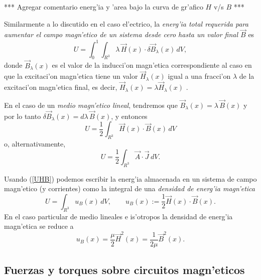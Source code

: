 *** Agregar comentario energ'ia y 'area bajo la curva de gr'afico $H$ v/s $B$ ***

Similarmente a lo discutido en el caso el'ectrico, la \textit{energ'ia total requerida para aumentar el campo magn'etico de un sistema desde cero hasta un valor final $\vec{B}$} es 
\begin{equation}
 U=\int_0^1\int_{R^3} \lambda \, \vec{H}(x)\cdot \delta\vec{B}_\lambda(x)\,dV,
\end{equation}
donde $\vec{B}_\lambda(x)$ es el valor de la inducci'on magn'etica correspondiente al caso en que la excitaci'on magn'etica tiene un valor $\vec{H}_\lambda(x)$ igual a una fracci'on $\lambda$ de la excitaci'on magn'etica final, es decir, $\vec{H}_\lambda (x)=\lambda\vec{H}_\lambda (x)$ .

En el caso de un \textit{medio magn'etico lineal}, tendremos que $\vec{B}_\lambda (x)=\lambda\, \vec{B}(x)$ y por lo tanto $\delta\vec{B}_\lambda (x)=d\lambda\,
\vec{B}(x)$, y entonces
\begin{equation}\label{UHB}
 \boxed{U=\frac{1}{2}\int_{R^3} \vec{H}(x)\cdot\vec{B}(x)\,dV }
\end{equation}
o, alternativamente, 
\begin{equation}
 \boxed{U=\frac{1}{2}\int_{R^3} \vec{A}\cdot \vec{J}\,dV.}
\end{equation}

Usando (\ref{UHB}) podemos escribir la energ'ia almacenada en un sistema de campo magn'etico (y corrientes) como la integral de una \textit{densidad de energ'ia magn'etica}
\begin{equation}
 \boxed{U=\int_{R^3} u_B(x)\,dV, \qquad u_B(x):=\frac{1}{2}\vec{H}(x)\cdot\vec{B}(x).}
\end{equation}
En el caso particular de medio lineales e is'otropos la densidad de energ'ia magn'etica se reduce a
\begin{equation}
 u_B(x)=\frac{\mu}{2}\vec{H}^2(x)=\frac{1}{2\mu}\vec{B}^2(x).
\end{equation}


\subsection{Fuerzas y torques sobre circuitos magn'eticos}
%

